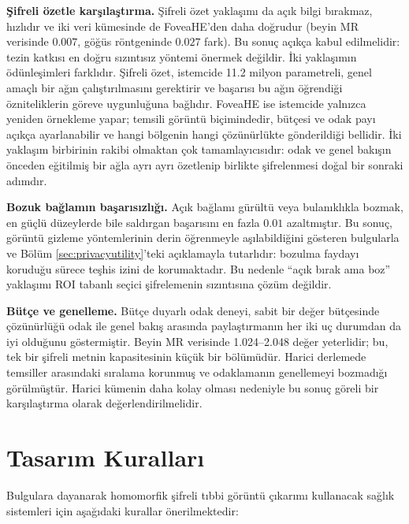 \textbf{Şifreli özetle karşılaştırma.} Şifreli özet yaklaşımı da açık bilgi bırakmaz, hızlıdır ve iki veri kümesinde de FoveaHE'den daha doğrudur (beyin MR verisinde $0.007$, göğüs röntgeninde $0.027$ fark). Bu sonuç açıkça kabul edilmelidir: tezin katkısı en doğru sızıntısız yöntemi önermek değildir. İki yaklaşımın ödünleşimleri farklıdır. Şifreli özet, istemcide 11.2 milyon parametreli, genel amaçlı bir ağın çalıştırılmasını gerektirir ve başarısı bu ağın öğrendiği özniteliklerin göreve uygunluğuna bağlıdır. FoveaHE ise istemcide yalnızca yeniden örnekleme yapar; temsili görüntü biçimindedir, bütçesi ve odak payı açıkça ayarlanabilir ve hangi bölgenin hangi çözünürlükte gönderildiği bellidir. İki yaklaşım birbirinin rakibi olmaktan çok tamamlayıcısıdır: odak ve genel bakışın önceden eğitilmiş bir ağla ayrı ayrı özetlenip birlikte şifrelenmesi doğal bir sonraki adımdır.

\textbf{Bozuk bağlamın başarısızlığı.} Açık bağlamı gürültü veya bulanıklıkla bozmak, en güçlü düzeylerde bile saldırgan başarısını en fazla $0.01$ azaltmıştır. Bu sonuç, görüntü gizleme yöntemlerinin derin öğrenmeyle aşılabildiğini gösteren bulgularla \cite{mcpherson2016obfuscation} ve Bölüm \ref{sec:privacyutility}'teki açıklamayla tutarlıdır: bozulma faydayı koruduğu sürece teşhis izini de korumaktadır. Bu nedenle ``açık bırak ama boz'' yaklaşımı ROI tabanlı seçici şifrelemenin sızıntısına çözüm değildir.

\textbf{Bütçe ve genelleme.} Bütçe duyarlı odak deneyi, sabit bir değer bütçesinde çözünürlüğü odak ile genel bakış arasında paylaştırmanın her iki uç durumdan da iyi olduğunu göstermiştir. Beyin MR verisinde 1.024--2.048 değer yeterlidir; bu, tek bir şifreli metnin kapasitesinin küçük bir bölümüdür. Harici derlemede temsiller arasındaki sıralama korunmuş ve odaklamanın genellemeyi bozmadığı görülmüştür. Harici kümenin daha kolay olması nedeniyle bu sonuç göreli bir karşılaştırma olarak değerlendirilmelidir.

\section{Tasarım Kuralları}\label{sec:kurallar}

Bulgulara dayanarak homomorfik şifreli tıbbi görüntü çıkarımı kullanacak sağlık sistemleri için aşağıdaki kurallar önerilmektedir:

